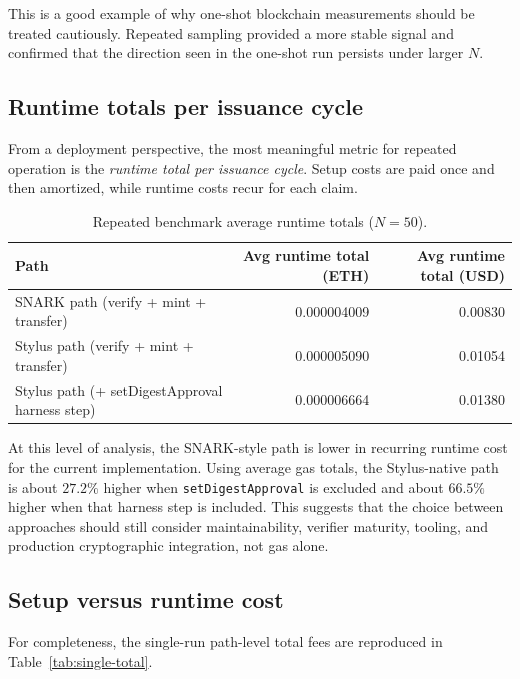 \documentclass[11pt]{article}
\begin{document}
This is a good example of why one-shot blockchain measurements should be treated cautiously. Repeated sampling provided a more stable signal and confirmed that the direction seen in the one-shot run persists under larger \(N\).

\subsection{Runtime totals per issuance cycle}
From a deployment perspective, the most meaningful metric for repeated operation is the \emph{runtime total per issuance cycle}. Setup costs are paid once and then amortized, while runtime costs recur for each claim.

\begin{table}[htbp]
\centering
\footnotesize
\caption{Repeated benchmark average runtime totals (\(N = 50\)).}
\label{tab:runtime-total}
\begin{tabular}{>{\raggedright\arraybackslash}p{6.2cm}rr}
\toprule
\textbf{Path} & \textbf{Avg runtime total (ETH)} & \textbf{Avg runtime total (USD)} \\
\midrule
SNARK path (verify + mint + transfer) & 0.000004009 & 0.00830 \\
Stylus path (verify + mint + transfer) & 0.000005090 & 0.01054 \\
Stylus path (+ setDigestApproval harness step) & 0.000006664 & 0.01380 \\
\bottomrule
\end{tabular}
\end{table}

At this level of analysis, the SNARK-style path is lower in recurring runtime cost for the current implementation. Using average gas totals, the Stylus-native path is about \(27.2\%\) higher when \texttt{setDigestApproval} is excluded and about \(66.5\%\) higher when that harness step is included. This suggests that the choice between approaches should still consider maintainability, verifier maturity, tooling, and production cryptographic integration, not gas alone.

\subsection{Setup versus runtime cost}
For completeness, the single-run path-level total fees are reproduced in Table~\ref{tab:single-total}.
\end{document}
